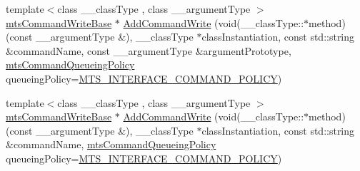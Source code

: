{\bf }\par
\begin{DoxyCompactItemize}
\item 
{\footnotesize template$<$class \+\_\+\+\_\+class\+Type , class \+\_\+\+\_\+argument\+Type $>$ }\\\hyperlink{classmts_command_write_base}{mts\+Command\+Write\+Base} $\ast$ \hyperlink{classmts_interface_provided_a8c4b4bafb7830c83688d24ee847c0592}{Add\+Command\+Write} (void(\+\_\+\+\_\+class\+Type\+::$\ast$method)(const \+\_\+\+\_\+argument\+Type \&), \+\_\+\+\_\+class\+Type $\ast$class\+Instantiation, const std\+::string \&command\+Name, const \+\_\+\+\_\+argument\+Type \&argument\+Prototype, \hyperlink{mts_forward_declarations_8h_aa2ac24035e136fa1689dcc2854c63fc7}{mts\+Command\+Queueing\+Policy} queueing\+Policy=\hyperlink{mts_forward_declarations_8h_aa2ac24035e136fa1689dcc2854c63fc7a4f444b4120a5e2efd084e2e5a214f5c8}{M\+T\+S\+\_\+\+I\+N\+T\+E\+R\+F\+A\+C\+E\+\_\+\+C\+O\+M\+M\+A\+N\+D\+\_\+\+P\+O\+L\+I\+C\+Y})
\item 
{\footnotesize template$<$class \+\_\+\+\_\+class\+Type , class \+\_\+\+\_\+argument\+Type $>$ }\\\hyperlink{classmts_command_write_base}{mts\+Command\+Write\+Base} $\ast$ \hyperlink{classmts_interface_provided_a9f662ac9d54dc015862bb2d325081518}{Add\+Command\+Write} (void(\+\_\+\+\_\+class\+Type\+::$\ast$method)(const \+\_\+\+\_\+argument\+Type \&), \+\_\+\+\_\+class\+Type $\ast$class\+Instantiation, const std\+::string \&command\+Name, \hyperlink{mts_forward_declarations_8h_aa2ac24035e136fa1689dcc2854c63fc7}{mts\+Command\+Queueing\+Policy} queueing\+Policy=\hyperlink{mts_forward_declarations_8h_aa2ac24035e136fa1689dcc2854c63fc7a4f444b4120a5e2efd084e2e5a214f5c8}{M\+T\+S\+\_\+\+I\+N\+T\+E\+R\+F\+A\+C\+E\+\_\+\+C\+O\+M\+M\+A\+N\+D\+\_\+\+P\+O\+L\+I\+C\+Y})
\end{DoxyCompactItemize}

